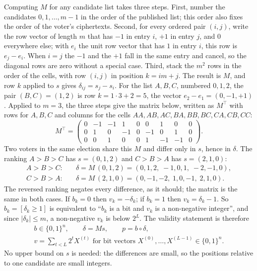 \documentclass[11pt,a4paper]{article}
\theoremstyle{remark}
\begin{document}
Computing $M$ for any candidate list takes three steps. First, number the
candidates $0, 1, \ldots, m - 1$ in the order of the published list; this
order also fixes the order of the voter's ciphertexts. Second, for every
ordered pair $(i, j)$, write the row vector of length $m$ that has $-1$ in
entry $i$, $+1$ in entry $j$, and $0$ everywhere else; with $e_i$ the unit
row vector that has $1$ in entry $i$, this row is $e_j - e_i$. When $i =
j$ the $-1$ and the $+1$ fall in the same entry and cancel, so the
diagonal rows are zero without a special case. Third, stack the $m^2$ rows
in the order of the cells, with row $(i, j)$ in position $k = i m + j$. The
result is $M$, and row $k$ applied to $s$ gives $\delta_{ij} = s_j - s_i$.
For the list $A, B, C$, numbered $0, 1, 2$, the pair $(B, C) = (1, 2)$ is
row $k = 1 \cdot 3 + 2 = 5$, the vector $e_2 - e_1 = (0, -1, +1)$. Applied
to $m = 3$, the three steps give the matrix below, written as $M^{\top}$
with rows for $A, B, C$ and columns for the cells $AA, AB, AC, BA, BB, BC,
CA, CB, CC$:
\[
  M^{\top} =
  \begin{pmatrix}
    0 & -1 & -1 & 1 & 0 & 0 & 1 & 0 & 0 \\
    0 & 1 & 0 & -1 & 0 & -1 & 0 & 1 & 0 \\
    0 & 0 & 1 & 0 & 0 & 1 & -1 & -1 & 0
  \end{pmatrix}.
\]
Two voters in the same election share this $M$ and differ only in $s$,
hence in $\delta$. The ranking $A > B > C$ has $s = (0, 1, 2)$ and $C > B
> A$ has $s = (2, 1, 0)$:
\begin{align*}
  A > B > C:&\quad \delta = M\,(0, 1, 2) = (0, 1, 2,\; -1, 0, 1,\; -2, -1, 0),\\
  C > B > A:&\quad \delta = M\,(2, 1, 0) = (0, -1, -2,\; 1, 0, -1,\; 2, 1, 0).
\end{align*}
The reversed ranking negates every difference, as it should; the matrix is
the same in both cases.
If $b_k = 0$ then $v_k = -\delta_k$; if $b_k = 1$ then $v_k = \delta_k - 1$.
So $b_k = [\delta_k \ge 1]$ is equivalent to ``$b_k$ is a bit and $v_k$ is a
non-negative integer'', and since $|\delta_k| \le m$, a non-negative $v_k$
is below $2^L$. The validity statement is therefore
\begin{equation}\label{eq:validity}
\begin{gathered}
  b \in \{0,1\}^n,\qquad
  \delta = M s,\qquad
  p = b \circ \delta,\\
  v = \sum_{t < L} 2^t X^{(t)} \text{ for bit vectors } X^{(0)}, \ldots, X^{(L-1)} \in \{0,1\}^n .
\end{gathered}
\end{equation}
No upper bound on $s$ is needed: the differences are small, so the
positions relative to one candidate are small integers.
\end{document}
